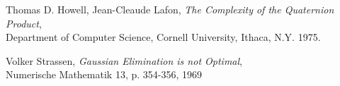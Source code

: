 \documentclass[paper=a4, fontsize=11pt]{scrartcl} %
\numberwithin{equation}{section} %
\numberwithin{figure}{section} %
\numberwithin{table}{section} %
\begin{document}
\begin{thebibliography}{9}

  Thomas D. Howell,
  Jean-Cleaude Lafon,
  \textit{The Complexity of the Quaternion Product}, \\
  Department of Computer Science, Cornell University, Ithaca, N.Y.
  1975.

  Volker Strassen,
  \textit{Gaussian Elimination is not Optimal}, \\
  Numerische Mathematik 13, p. 354-356, 1969
\end{thebibliography}
\end{document}
